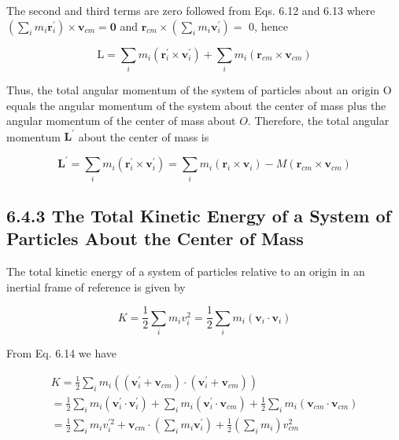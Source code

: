 \documentclass[10pt]{article}
\begin{document}
The second and third terms are zero followed from Eqs. 6.12 and 6.13 where $\left(\sum_{i} m_{i} \mathbf{r}_{i}^{\prime}\right) \times \mathbf{v}_{c m}=\mathbf{0}$ and $\mathbf{r}_{c m} \times\left(\sum_{i} m_{i} \mathbf{v}_{i}^{\prime}\right)=$ 0, hence

$$
\mathrm{L}=\sum_{i} m_{i}\left(\mathbf{r}_{i}^{\prime} \times \mathbf{v}_{i}^{\prime}\right)+\sum_{i} m_{i}\left(\mathbf{r}_{c m} \times \mathbf{v}_{c m}\right)
$$

Thus, the total angular momentum of the system of particles about an origin O equals the angular momentum of the system about the center of mass plus the angular momentum of the center of mass about $O$. Therefore, the total angular momentum $\mathbf{L}^{\prime}$ about the center of mass is


\begin{equation*}
\mathbf{L}^{\prime}=\sum_{i} m_{i}\left(\mathbf{r}_{i}^{\prime} \times \mathbf{v}_{i}^{\prime}\right)=\sum_{i} m_{i}\left(\mathbf{r}_{i} \times \mathbf{v}_{i}\right)-M\left(\mathbf{r}_{c m} \times \mathbf{v}_{c m}\right) \tag{6.15}
\end{equation*}


\subsection*{6.4.3 The Total Kinetic Energy of a System of Particles About the Center of Mass}
The total kinetic energy of a system of particles relative to an origin in an inertial frame of reference is given by

$$
K=\frac{1}{2} \sum_{i} m_{i} v_{i}^{2}=\frac{1}{2} \sum_{i} m_{i}\left(\mathbf{v}_{i} \cdot \mathbf{v}_{i}\right)
$$

From Eq. 6.14 we have

$$
\begin{gathered}
K=\frac{1}{2} \sum_{i} m_{i}\left(\left(\mathbf{v}_{i}^{\prime}+\mathbf{v}_{c m}\right) \cdot\left(\mathbf{v}_{i}^{\prime}+\mathbf{v}_{c m}\right)\right) \\
=\frac{1}{2} \sum_{i} m_{i}\left(\mathbf{v}_{i}^{\prime} \cdot \mathbf{v}_{i}^{\prime}\right)+\sum_{i} m_{i}\left(\mathbf{v}_{i}^{\prime} \cdot \mathbf{v}_{c m}\right)+\frac{1}{2} \sum_{i} m_{i}\left(\mathbf{v}_{c m} \cdot \mathbf{v}_{c m}\right) \\
=\frac{1}{2} \sum_{i} m_{i} v_{i}^{\prime 2}+\mathbf{v}_{c m} \cdot\left(\sum_{i} m_{i} \mathbf{v}_{i}^{\prime}\right)+\frac{1}{2}\left(\sum_{i} m_{i}\right) v_{c m}^{2}
\end{gathered}
$$
\end{document}

